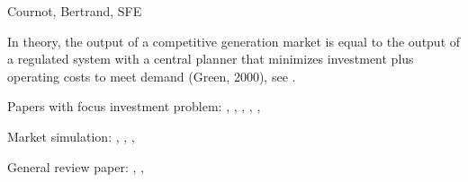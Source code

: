 Cournot, Bertrand, SFE


In theory, the output of a competitive generation market is equal to the output of a regulated system with a central planner that minimizes investment plus operating costs to meet demand (Green, 2000), see \citep[see][pg. 111]{Rothwell2003}.

Papers with focus investment problem: \cite{Pineau2003}, \cite{Murphy2005}, \cite{Genc2007}, \cite{Kiesling2007}, \cite{Barmack2007}, \cite{Sauma2006}

Market simulation: \cite{Torre2003}, \cite{Valenzuela2007}, \cite{Hobbs2001},\cite{Otero-Novas2000}

General review paper: \cite{Neuhoff2005}, \cite{Ventosa2005}, \cite{Kahn1998}

